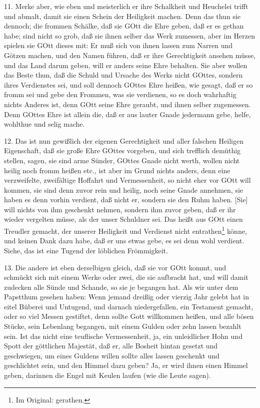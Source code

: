 11. Merke aber, wie eben und meisterlich er ihre Schalkheit und Heuchelei trifft und abmalt, damit sie einen Schein der Heiligkeit machen. Denn das thun sie dennoch; die frommen Schälke, daß sie GOtt die Ehre geben, daß er es gethan habe; sind nicht so grob, daß sie ihnen selber das Werk zumessen, aber im Herzen spielen sie GOtt dieses mit: Er muß sich von ihnen lassen zum Narren und Götzen machen, und den Namen führen, daß er ihre Gerechtigkeit ansehen müsse, und das Land darum geben, will er anders seine Ehre behalten. Sie aber wollen das Beste thun, daß die Schuld und Ursache des Werks nicht GOttes, sondern ihres Verdienstes sei, und soll dennoch GOttes Ehre heißen, wie gesagt, daß er so fromm sei und gebe den Frommen, was sie verdienen, so es doch wahrhaftig nichts Anderes ist, denn GOtt seine Ehre geraubt, und ihnen selber zugemessen. Denn GOttes Ehre ist allein die, daß er aus lauter Gnade jedermann gebe, helfe, wohlthue und selig mache.

12. Das ist nun gewißlich der eigenen Gerechtigkeit und aller falschen Heiligen Eigenschaft, daß sie große Ehre GOttes vorgeben, und sich trefflich demüthig stellen, sagen, sie sind arme Sünder, GOttes Gnade nicht werth, wollen nicht heilig noch fromm heißen etc., ist aber im Grund nichts anders, denn eine verzweifelte, zweifältige Hoffahrt und Vermessenheit, so nicht
eher vor GOtt will kommen, sie sind denn zuvor rein und heilig, noch seine Gnade annehmen, sie haben es denn vorhin verdient, daß nicht er, sondern sie den Ruhm haben. [Sie] will nichts von ihm geschenkt nehmen, sondern ihm zuvor geben, daß er ihr wieder vergelten müsse, als der unser Schuldner sei. Das heißt aus GOtt einen Treudler gemacht, der unserer Heiligkeit und Verdienst nicht entrathen\footnote{Im Original: gerathen.} könne, und keinen Dank dazu habe, daß er uns etwas gebe, es sei denn wohl verdient. Siehe, das ist eine Tugend der löblichen Frömmigkeit.

13. Die andere ist eben derselbigen gleich, daß sie vor GOtt kommt, und schmückt sich mit einem Werke oder zwei, die sie aufbracht hat, und will damit zudecken alle Sünde und Schande, so sie je begangen hat. Als wir unter dem Papstthum gesehen haben: Wenn jemand dreißig oder vierzig Jahr gelebt hat in eitel Büberei und Untugend, und darnach niedergefallen, ein Testament gemacht, oder so viel Messen gestiftet, denn sollte Gott willkommen heißen, und alle bösen Stücke, sein Lebenlang begangen, mit einem Gulden oder zehn lassen bezahlt sein. Ist das nicht eine teuflische Vermessenheit, ja, ein unleidlicher Hohn und Spott der göttlichen Majestät, daß er, alle Bosheit hintan gesetzt und geschwiegen, um eines Guldens willen sollte alles lassen geschenkt und geschlichtet sein, und den Himmel dazu geben? Ja, er wird ihnen einen Himmel geben, darinnen die Engel mit Keulen laufen (wie die Leute sagen).

